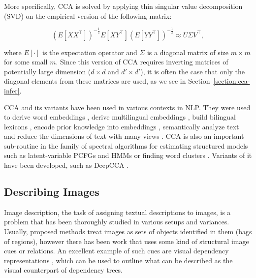 \documentclass[letterpaper]{article}
\begin{document}
More specifically, CCA is solved by applying thin singular value decomposition (SVD) on the
empirical version of the following matrix:

\begin{equation}
(E[XX^{\top}])^{-\frac{1}{2}} E[XY^{\top}](E[YY^{\top}])^{-\frac{1}{2}} \approx U \Sigma V^{\top},
\end{equation}

\noindent where $E[\cdot]$ is the expectation operator and $\Sigma$ is a diagonal
matrix of size $m \times m$ for some small $m$. Since this version
of CCA requires inverting matrices of potentially large dimension ($d \times d$
and $d' \times d'$), it is often the case that only the diagonal elements
from these matrices are used, as we see in Section~\ref{section:cca-infer}.


CCA and its variants have been used in various contexts in NLP. They were
used to derive word embeddings \cite{dhillon2015eigenwords},
derive multilingual embeddings \cite{faruqui2014improving,lu2015deep},
build bilingual lexicons \cite{haghighi2008learning}, encode prior knowledge
into embeddings \cite{osborne-16}, semantically analyze text \cite{vinokourov2002inferring}
and reduce the dimensions of text with many views \cite{rastogi2015multiview}.
CCA is also an important sub-routine in the family of spectral algorithms for estimating
structured models such as latent-variable PCFGs and HMMs \cite{cohen-12,stratos-16} or finding word
clusters \cite{stratos2014spectral}.
Variants of it have been developed, such as DeepCCA \cite{andrew2013deep}.



\subsection{Describing Images}
\label{section:related}

Image description, the task of assigning textual descriptions to images, is a problem that has been thoroughly studied in various setups and variances.
Usually, proposed methods treat images as sets of objects identified in them (bags of regions),
however there has been work that uses some kind of structural image cues or relations. An excellent example of such cues are visual dependency representations \cite{elliott2013image},
which can be used to outline what can be described as the visual counterpart of dependency trees.
\end{document}
